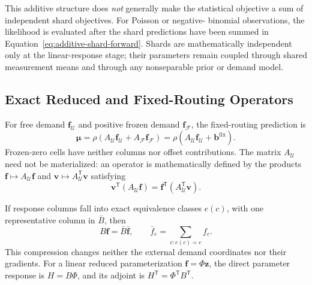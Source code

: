 This additive structure does \emph{not} generally make the statistical
objective a sum of independent shard objectives.  For Poisson or negative-
binomial observations, the likelihood is evaluated after the shard predictions
have been summed in Equation~\eqref{eq:additive-shard-forward}.  Shards are
mathematically independent only at the linear-response stage; their parameters
remain coupled through shared measurement means and through any nonseparable
prior or demand model.

\subsection{Exact Reduced and Fixed-Routing Operators}

For free demand $\bm f_{\mathcal U}$ and positive frozen demand
$\bm f_{\mathcal F}$, the fixed-routing prediction is
\[
 \bm\mu=\rho\left(A_{\mathcal U}\bm f_{\mathcal U}
                 +A_{\mathcal F}\bm f_{\mathcal F}\right)
        =\rho\left(A_{\mathcal U}\bm f_{\mathcal U}
                 +\bm b^{\mathrm{fix}}\right).
\]
Frozen-zero cells have neither columns nor offset contributions. The matrix
$A_{\mathcal U}$ need not be materialized: an operator is mathematically
defined by the products $\bm f\mapsto A_{\mathcal U}\bm f$ and
$\bm v\mapsto A_{\mathcal U}^{\mathsf T}\bm v$ satisfying
\[
 \bm v^{\mathsf T}(A_{\mathcal U}\bm f)
 =\bm f^{\mathsf T}(A_{\mathcal U}^{\mathsf T}\bm v).
\]

If response columns fall into exact equivalence classes $e(c)$, with one
representative column in $\bar B$, then
\[
 B\bm f=\bar B\bar{\bm f},
 \qquad
 \bar f_e=\sum_{c:e(c)=e}f_c.
\]
This compression changes neither the external demand coordinates nor their
gradients. For a linear reduced parameterization $\bm f=\Phi\bm z$, the direct
parameter response is $H=B\Phi$, and its adjoint is
$H^{\mathsf T}=\Phi^{\mathsf T}B^{\mathsf T}$.


